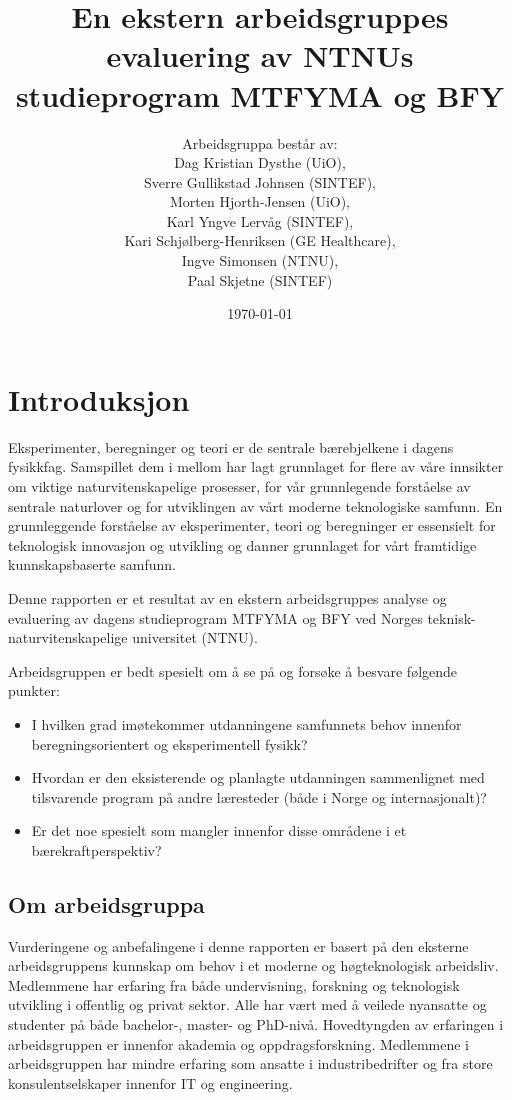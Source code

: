 \documentclass{article}
\title{En ekstern arbeidsgruppes evaluering av NTNUs studieprogram MTFYMA og BFY}
\author{Arbeidsgruppa består av: \\ Dag Kristian Dysthe (UiO), \\ Sverre Gullikstad Johnsen (SINTEF), \\ Morten Hjorth-Jensen (UiO), \\ Karl Yngve Lervåg (SINTEF), \\ Kari Schjølberg-Henriksen (GE Healthcare), \\ Ingve Simonsen (NTNU), \\ Paal Skjetne (SINTEF)}
\date{\today}
\begin{document}
\maketitle
\listoftodos
\tableofcontents

\begin{abstract}
\end{abstract}

\section{Introduksjon}
Eksperimenter, beregninger og teori er de sentrale bærebjelkene i dagens fysikkfag. Samspillet dem i mellom  har lagt grunnlaget for flere av våre innsikter om viktige naturvitenskapelige prosesser, for vår grunnlegende forståelse av sentrale naturlover og for utviklingen av vårt moderne teknologiske samfunn. En grunnleggende forståelse av eksperimenter, teori og beregninger er essensielt for  teknologisk innovasjon og utvikling og danner grunnlaget for vårt framtidige kunnskapsbaserte samfunn.

Denne rapporten er et resultat av en ekstern arbeidsgruppes analyse og evaluering av dagens studieprogram MTFYMA og BFY ved Norges teknisk-naturvitenskapelige universitet (NTNU). 

Arbeidsgruppen er bedt spesielt om å se på og forsøke å besvare følgende punkter:
\begin{itemize}
  \item I hvilken grad imøtekommer utdanningene samfunnets behov innenfor beregningsorientert og eksperimentell fysikk?
  \item Hvordan er den eksisterende og planlagte utdanningen sammenlignet med tilsvarende program på andre læresteder (både i Norge og internasjonalt)?
  \item Er det noe spesielt som mangler innenfor disse områdene i et bærekraftperspektiv?
\end{itemize}

\subsection{Om arbeidsgruppa}
Vurderingene og anbefalingene i denne rapporten er basert på den eksterne arbeidsgruppens kunnskap om behov i et moderne og høgteknologisk arbeidsliv.  Medlemmene har erfaring fra både undervisning, forskning og teknologisk utvikling i offentlig og privat sektor. Alle har vært med å veilede nyansatte og studenter på både bachelor-, master- og PhD-nivå. Hovedtyngden av erfaringen i arbeidsgruppen er innenfor akademia og oppdragsforskning. Medlemmene i arbeidsgruppen har mindre erfaring som ansatte i industribedrifter og fra store konsulentselskaper innenfor IT og engineering.
\end{document}
